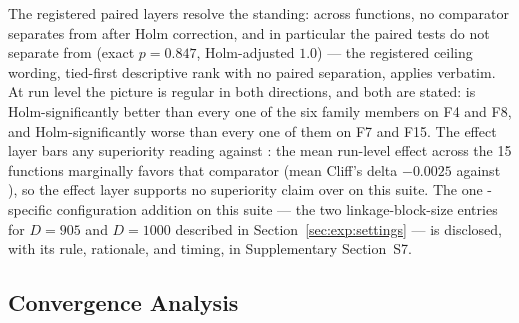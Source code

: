 The registered paired layers resolve the standing: across functions, no
comparator separates from \dtgsk{} after Holm correction, and in
particular the paired tests do not separate \dtgsk{} from \agsk{} (exact
$p = 0.847$, Holm-adjusted $1.0$) --- the registered ceiling wording,
tied-first descriptive rank with no paired separation, applies verbatim.
At run level the picture is regular in both directions, and both are
stated: \dtgsk{} is Holm-significantly better than every one of the six
family members on F4 and F8, and Holm-significantly worse than every one
of them on F7 and F15.
The effect layer bars any superiority reading against \atmals{}: the
mean run-level effect across the 15 functions marginally favors that
comparator (mean Cliff's delta $-0.0025$ against \dtgsk{}), so the
effect layer supports no superiority claim over \atmals{} on this suite.
The one \dtgsk{}-specific configuration addition on this suite --- the
two linkage-block-size entries for $D = 905$ and $D = 1000$ described in
Section~\ref{sec:exp:settings} --- is disclosed, with its rule,
rationale, and timing, in Supplementary Section~S7.

\subsection{Convergence Analysis}\label{sec:exp:convergence}

